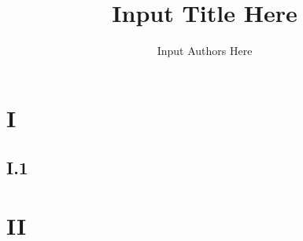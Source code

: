 \documentclass[10pt,twocolumn]{article}
\title{Input Title Here}
\author{Input Authors Here}
\date{}
\begin{document}
\maketitle

\section{I}

\subsection{I.1}

\section{II}



\end{document}
